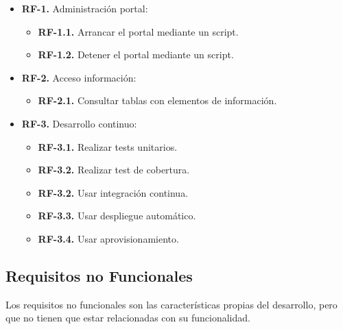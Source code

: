 \begin{itemize}
  \item \textbf{RF-1.} Administración portal:
    \begin{itemize}
    \item \textbf{RF-1.1.} Arrancar el portal mediante un script.
    \item \textbf{RF-1.2.} Detener el portal mediante un script.
    \end{itemize}
\end{itemize}

\begin{itemize}
  \item \textbf{RF-2.} Acceso información:
    \begin{itemize}
    \item \textbf{RF-2.1.} Consultar tablas con elementos de información.
    \end{itemize}
\end{itemize}

\begin{itemize}
  \item \textbf{RF-3.} Desarrollo continuo:
  \begin{itemize}
    \item \textbf{RF-3.1.} Realizar tests unitarios.
    \item \textbf{RF-3.2.} Realizar test de cobertura.
    \item \textbf{RF-3.2.} Usar integración continua.
    \item \textbf{RF-3.3.} Usar despliegue automático.
    \item \textbf{RF-3.4.} Usar aprovisionamiento.
    \end{itemize}
\end{itemize}

\subsection{Requisitos no Funcionales}

Los requisitos no funcionales son las características propias del desarrollo, pero que no tienen que estar relacionadas con su 
funcionalidad.

